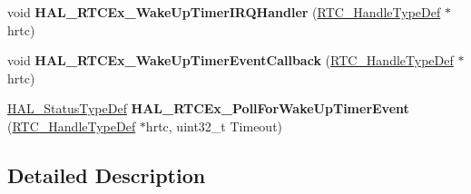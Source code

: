 \begin{DoxyCompactItemize}
\item 
void {\bfseries H\+A\+L\+\_\+\+R\+T\+C\+Ex\+\_\+\+Wake\+Up\+Timer\+I\+R\+Q\+Handler} (\hyperlink{struct_r_t_c___handle_type_def}{R\+T\+C\+\_\+\+Handle\+Type\+Def} $\ast$hrtc)\hypertarget{group___r_t_c_ex___exported___functions___group2_ga5e391424483012fe09827739dc53885f}{}\label{group___r_t_c_ex___exported___functions___group2_ga5e391424483012fe09827739dc53885f}

\item 
void {\bfseries H\+A\+L\+\_\+\+R\+T\+C\+Ex\+\_\+\+Wake\+Up\+Timer\+Event\+Callback} (\hyperlink{struct_r_t_c___handle_type_def}{R\+T\+C\+\_\+\+Handle\+Type\+Def} $\ast$hrtc)\hypertarget{group___r_t_c_ex___exported___functions___group2_gac9ed5d6224b5c86f2845a9c1af7d94de}{}\label{group___r_t_c_ex___exported___functions___group2_gac9ed5d6224b5c86f2845a9c1af7d94de}

\item 
\hyperlink{stm32f4xx__hal__def_8h_a63c0679d1cb8b8c684fbb0632743478f}{H\+A\+L\+\_\+\+Status\+Type\+Def} {\bfseries H\+A\+L\+\_\+\+R\+T\+C\+Ex\+\_\+\+Poll\+For\+Wake\+Up\+Timer\+Event} (\hyperlink{struct_r_t_c___handle_type_def}{R\+T\+C\+\_\+\+Handle\+Type\+Def} $\ast$hrtc, uint32\+\_\+t Timeout)\hypertarget{group___r_t_c_ex___exported___functions___group2_ga13cdc56c03d2d606ef8c635dcc25f555}{}\label{group___r_t_c_ex___exported___functions___group2_ga13cdc56c03d2d606ef8c635dcc25f555}

\end{DoxyCompactItemize}


\subsection{Detailed Description}
